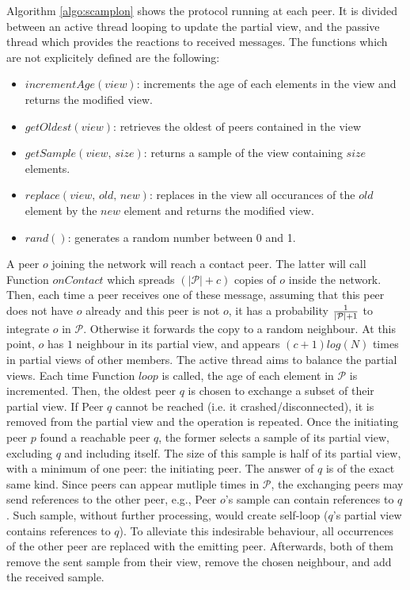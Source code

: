 \begin{asparadesc}
\item [Algorithm]\ref{algo:scamplon} shows the \SCAMPLON{} protocol running at
  each peer. It is divided between an active thread looping to update the
  partial view, and the passive thread which provides the reactions to received
  messages. The functions which are not explicitely defined are the following:
  \begin{itemize}
  \item $incrementAge(view)$: increments the age of each elements in the view
    and returns the modified view.
  \item $getOldest(view)$: retrieves the oldest of peers contained in the view
  \item $getSample(view, \, size)$: returns a sample of the view containing
    $size$ elements.
  \item $replace(view,\,old,\,new)$: replaces in the view all occurances of the
    $old$ element by the $new$ element and returns the modified view.
  \item $rand()$: generates a random number between 0 and 1.
  \end{itemize}
  A peer $o$ joining the network will reach a contact peer. The latter will
  call Function $onContact$ which spreads $(|\mathcal{P}|+c)$ copies of $o$
  inside the network. Then, each time a peer receives one of these message,
  assuming that this peer does not have $o$ already and this peer is not $o$,
  it has a probability $1\over{|\mathcal{P}|+1}$ to integrate $o$ in
  $\mathcal{P}$. Otherwise it forwards the copy to a random neighbour.  At this
  point, $o$ has $1$ neighbour in its partial view, and appears $(c+1)log(N)$
  times in partial views of other members. The active thread aims to balance
  the partial views. Each time Function $loop$ is called, the age of each
  element in $\mathcal{P}$ is incremented. Then, the oldest peer $q$ is chosen
  to exchange a subset of their partial view. If Peer $q$ cannot be reached
  (i.e. it crashed/disconnected), it is removed from the partial view and the
  operation is repeated. Once the initiating peer $p$ found a reachable peer
  $q$, the former selects a sample of its partial view, excluding $q$ and
  including itself. The size of this sample is half of its partial view, with a
  minimum of one peer: the initiating peer. The answer of $q$ is of the exact
  same kind. Since peers can appear mutliple times in $\mathcal{P}$, the
  exchanging peers may send references to the other peer, e.g., Peer $o$'s
  sample can contain references to $q$. Such sample, without further
  processing, would create self-loop ($q$'s partial view contains references to
  $q$). To alleviate this indesirable behaviour, all occurrences of the other
  peer are replaced with the emitting peer.  Afterwards, both of them remove
  the sent sample from their view, remove the chosen neighbour, and add the
  received sample.
\end{asparadesc}

